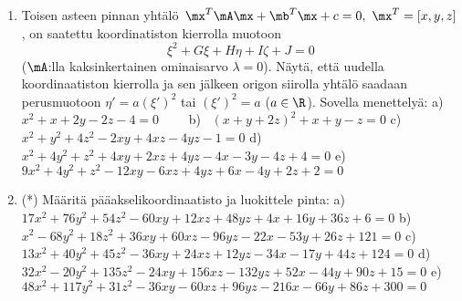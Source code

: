 \begin{enumerate}
\item \label{H-eig-3: pintojen erikoisluokka}
Toisen asteen pinnan yhtälö $\,\mx^T\mA\mx+\mb^T\mx+c=0,\ \mx^T=[x,y,z]$, on saatettu
koordinatiston kierrolla muotoon
\[
\xi^2+G\xi+H\eta+I\zeta+J=0
\]
($\mA$:lla kaksinkertainen ominaisarvo $\lambda=0$). Näytä, että uudella koordinaatiston
kierrolla ja sen jälkeen origon siirolla yhtälö saadaan perusmuotoon $\eta'=a(\xi')^2$ tai
$(\xi')^2=a$ ($a\in\R$). Sovella menettelyä: \vspace{1mm}\newline
a) \ $x^2+x+2y-2z-4=0 \qquad$
b) \ $(x+y+2z)^2+x+y-z=0$ \newline
c) \ $x^2+y^2+4z^2-2xy+4xz-4yz-1=0$ \newline
d) \ $x^2+4y^2+z^2+4xy+2xz+4yz-4x-3y-4z+4=0$ \newline
e) \ $9x^2+4y^2+z^2-12xy-6xz+4yz+6x-4y+2z+2=0$

\item (*)
Määritä pääakselikoordinaatisto ja luokittele pinta: \vspace{1mm}\newline
a) \ $17x^2+76y^2+54z^2-60xy+12xz+48yz+4x+16y+36z+6=0$ \newline
b) \ $x^2-68y^2+18z^2+36xy+60xz-96yz-22x-53y+26z+121=0$ \newline
c) \ $13x^2+40y^2+45z^2-36xy+24xz+12yz-34x-17y+44z+124=0$ \newline
d) \ $32x^2-20y^2+135z^2-24xy+156xz-132yz+52x-44y+90z+15=0$ \newline
e) \ $48x^2+117y^2+31z^2-36xy-60xz+96yz-216x-66y+86z+300=0$

\end{enumerate}



